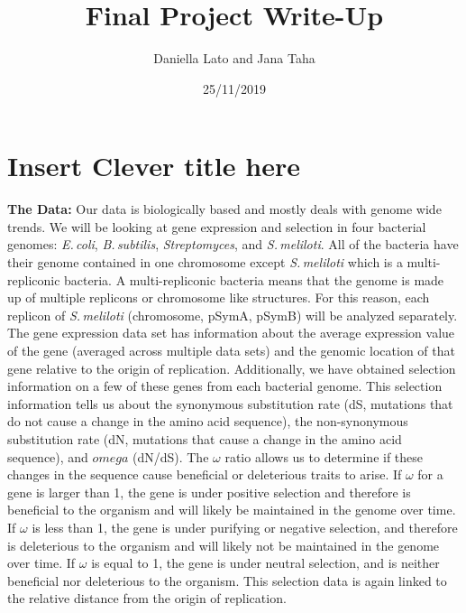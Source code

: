 \documentclass[12pt,]{article}
\title{Final Project Write-Up}
\author{Daniella Lato and Jana Taha}
\date{25/11/2019}
\begin{document}
\maketitle

\newcommand{\smel}{\textit{S.\,meliloti}\xspace}
\newcommand{\bass}{\textit{B.\,subtilis}\xspace}
\newcommand{\ecol}{\textit{E.\,coli}\xspace}
\newcommand{\strep}{\textit{Streptomyces}\xspace}

\hypertarget{insert-clever-title-here}{%
\section{Insert Clever title here}\label{insert-clever-title-here}}

\textbf{The Data:} Our data is biologically based and mostly deals with
genome wide trends. We will be looking at gene expression and selection
in four bacterial genomes: \textit{E.\,coli}\xspace,
\textit{B.\,subtilis}\xspace, \textit{Streptomyces}\xspace, and
\textit{S.\,meliloti}\xspace. All of the bacteria have their genome
contained in one chromosome except \textit{S.\,meliloti}\xspace which is
a multi-repliconic bacteria. A multi-repliconic bacteria means that the
genome is made up of multiple replicons or chromosome like structures.
For this reason, each replicon of \textit{S.\,meliloti}\xspace
(chromosome, pSymA, pSymB) will be analyzed separately. The gene
expression data set has information about the average expression value
of the gene (averaged across multiple data sets) and the genomic
location of that gene relative to the origin of replication.
Additionally, we have obtained selection information on a few of these
genes from each bacterial genome. This selection information tells us
about the synonymous substitution rate (dS, mutations that do not cause
a change in the amino acid sequence), the non-synonymous substitution
rate (dN, mutations that cause a change in the amino acid sequence), and
\(omega\) (dN/dS). The \(\omega\) ratio allows us to determine if these
changes in the sequence cause beneficial or deleterious traits to arise.
If \(\omega\) for a gene is larger than 1, the gene is under positive
selection and therefore is beneficial to the organism and will likely be
maintained in the genome over time. If \(\omega\) is less than 1, the
gene is under purifying or negative selection, and therefore is
deleterious to the organism and will likely not be maintained in the
genome over time. If \(\omega\) is equal to 1, the gene is under neutral
selection, and is neither beneficial nor deleterious to the organism.
This selection data is again linked to the relative distance from the
origin of replication.
\end{document}
